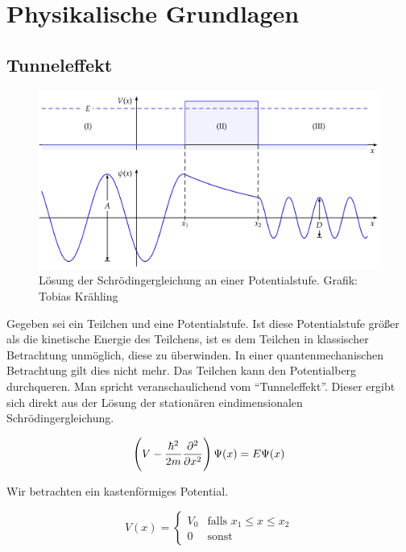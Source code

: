 \documentclass[a4paper,german,12pt,smallheadings]{scrartcl}
\begin{document}


\begin{titlepage}

\end{titlepage}

\allowdisplaybreaks %

\section{Physikalische Grundlagen}
\subsection{Tunneleffekt}

\begin{figure}[h!]
  \centering
  \includegraphics[width=1.0 \textwidth]{pic2.png}
  \caption{Lösung der Schrödingergleichung an einer Potentialstufe. Grafik: Tobias Krähling}
\end{figure}

Gegeben sei ein Teilchen und eine Potentialstufe. Ist diese Potentialstufe
größer als die kinetische Energie des Teilchens, ist es dem Teilchen in
klassischer Betrachtung unmöglich, diese zu überwinden. In einer
quantenmechanischen Betrachtung gilt dies nicht mehr. Das Teilchen kann den
Potentialberg durchqueren. Man spricht veranschaulichend vom ``Tunneleffekt''.
Dieser ergibt sich direkt aus der Lösung der stationären eindimensionalen
Schrödingergleichung.

\begin{equation}
  \del{V - \frac{\hbar^2}{2m} \frac{\partial^2}{\partial x^2}} \Psi(x) = E \Psi(x)
\end{equation}

Wir betrachten ein kastenförmiges Potential.

\begin{equation}
  V(x) = \begin{cases} V_0 & \text{falls } x_1 \le x \le x_2 \\ 0 & \text{sonst} \end{cases}
\end{equation}
\end{document}
